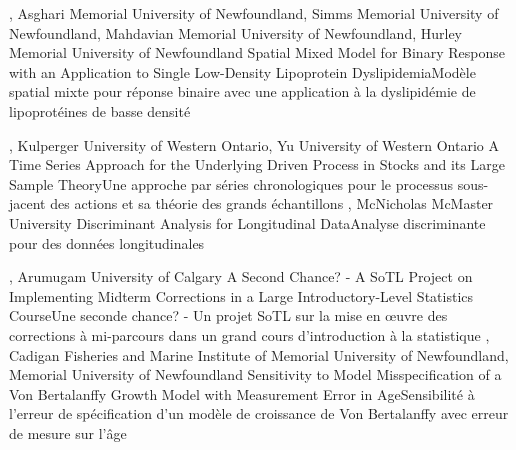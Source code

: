 {
,  {Asghari}
{Memorial University of Newfoundland},  {Simms}
{Memorial University of Newfoundland},  {Mahdavian}
{Memorial University of Newfoundland},  {Hurley}
{Memorial University of Newfoundland}
}
{Spatial Mixed Model for Binary Response with an Application to Single Low-Density Lipoprotein Dyslipidemia}{Modèle spatial mixte pour réponse binaire avec une application à la dyslipidémie de lipoprotéines de basse densité}
{\bubbleE \enspace \screenE}

{
,  {Kulperger}
{University of Western Ontario},  {Yu}
{University of Western Ontario}
}
{A Time Series Approach for the Underlying Driven Process in Stocks and its Large Sample Theory}{Une approche par séries chronologiques pour le processus sous-jacent des actions et sa théorie des grands échantillons}
{\bubbleE \enspace \screenE}
{
,  {McNicholas}
{McMaster University}
}
{Discriminant Analysis for Longitudinal Data}{Analyse discriminante pour des données longitudinales}
{\bubbleE \enspace \screenE}

{
,  {Arumugam}
{University of Calgary}
}
{A Second Chance? - A SoTL Project on Implementing Midterm Corrections in a Large Introductory-Level Statistics Course}{Une seconde chance? - Un projet SoTL sur la mise en œuvre des corrections à mi-parcours dans un grand cours d'introduction à la statistique}
{\bubbleE \enspace \screenE}
{
,  {Cadigan}
{Fisheries and Marine Institute of Memorial University of Newfoundland}, 
{Memorial University of Newfoundland}
}
{Sensitivity to Model Misspecification of a Von Bertalanffy Growth Model with Measurement Error in Age}{Sensibilité à l’erreur de spécification d’un modèle de croissance de Von Bertalanffy avec erreur de mesure sur l’âge}
{\bubbleE \enspace \screenE}

